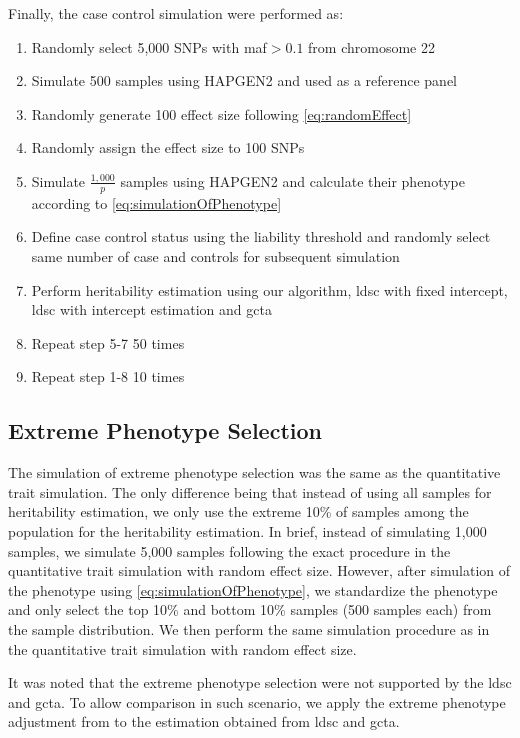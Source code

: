 		Finally, the case control simulation were performed as:
		\begin{enumerate}
			\item Randomly select 5,000 \glspl{SNP} with \gls{maf}$>0.1$ from chromosome 22
			\item Simulate 500 samples using HAPGEN2 and used as a reference panel
			\item Randomly generate 100 effect size following  \cref{eq:randomEffect}
			\item Randomly assign the effect size to 100 \glspl{SNP}
			\item Simulate $\frac{1,000}{p}$ samples using HAPGEN2 and calculate their phenotype according to \cref{eq:simulationOfPhenotype}
			\item Define case control status using the liability threshold and randomly select same number of case and controls for subsequent simulation
			\item Perform heritability estimation using our algorithm, \gls{ldsc} with fixed intercept, \gls{ldsc} with intercept estimation and \gls{gcta}
			\item Repeat step 5-7 50 times
			\item Repeat step 1-8 10 times
		\end{enumerate}
		
		\subsection{Extreme Phenotype Selection}
		The simulation of extreme phenotype selection was the same as the quantitative trait simulation. 
		The only difference being that instead of using all samples for heritability estimation, we only use the extreme 10\% of samples among the population for the heritability estimation.
		In brief, instead of simulating 1,000 samples, we simulate 5,000 samples following the exact procedure in the quantitative trait simulation with random effect size.
		However, after simulation of the phenotype using \cref{eq:simulationOfPhenotype}, we standardize the phenotype and only select the top 10\% and bottom 10\% samples (500 samples each) from the sample distribution.
		We then perform the same simulation procedure as in the quantitative trait simulation with random effect size.
		
		It was noted that the extreme phenotype selection were not supported by the \gls{ldsc} and \gls{gcta}.
		To allow comparison in such scenario, we apply the extreme phenotype adjustment from \citet{Sham2014} to the estimation obtained from \gls{ldsc} and \gls{gcta}.
	
